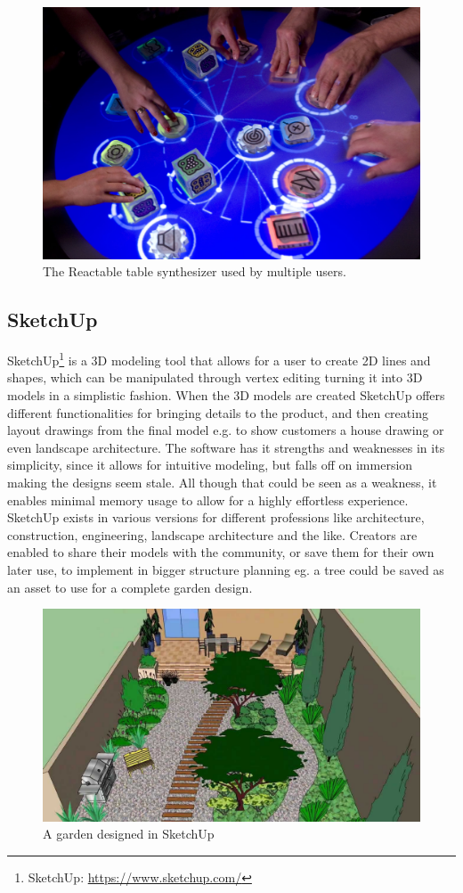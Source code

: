 \begin{figure}[H]
	\centering
	\includegraphics[width=0.6\linewidth]{figure/Analysis/reactable}
	\caption{The Reactable table synthesizer used by multiple users.}
	\label{fig:reactable}
\end{figure} 

\subsection{SketchUp}
SketchUp\footnote{SketchUp: \url{https://www.sketchup.com/}} is a 3D modeling tool that allows for a user to create 2D lines and shapes, which can be manipulated through vertex editing turning it into 3D models in a simplistic fashion. When the 3D models are created SketchUp offers different functionalities for bringing details to the product, and then creating layout drawings from the final	model e.g. to show customers a house drawing or even landscape architecture. The software has it strengths and weaknesses in its simplicity, since it allows for intuitive modeling, but falls off on immersion making the designs seem stale. All though that could be seen as a weakness, it enables minimal memory usage to allow for a highly effortless experience. \\

SketchUp exists in various versions for different professions like architecture, construction, engineering, landscape architecture and the like. Creators are enabled to share their models with the community, or save them for their own later use, to implement in bigger structure planning eg. a tree could be saved as an asset to use for a complete garden design.

\begin{figure}[H]
	\centering
	\includegraphics[width=0.6\linewidth]{figure/Analysis/sketchupgarden}
	\caption{A garden designed in SketchUp}
	\label{fig:sketchupgarden}
\end{figure}


